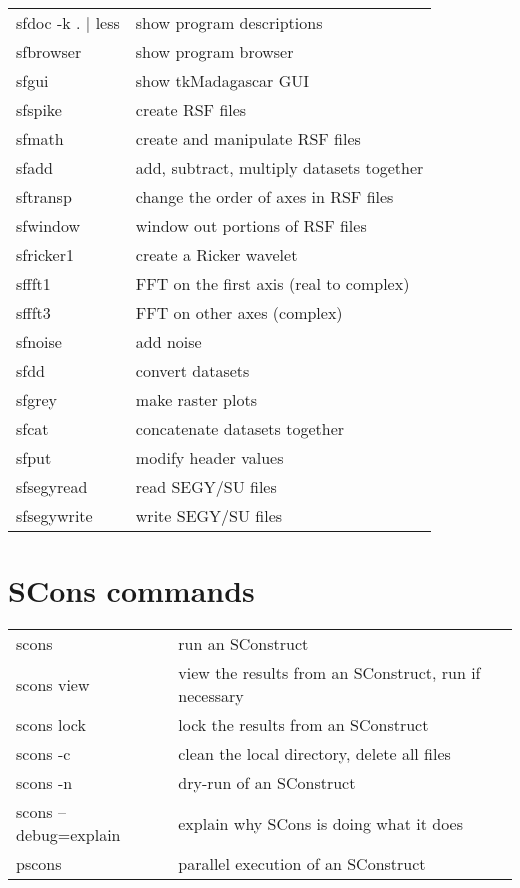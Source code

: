 \begin{tabular}{| l | l |}
   \hline 
   sfdoc -k . $|$ less & show program descriptions \\
   sfbrowser & show program browser \\
   sfgui & show tkMadagascar GUI \\
   sfspike & create RSF files \\
   sfmath & create and manipulate RSF files \\
   sfadd & add, subtract, multiply datasets together \\
   sftransp & change the order of axes in RSF files \\
   sfwindow & window out portions of RSF files \\
   sfricker1 & create a Ricker wavelet \\
   sffft1 & FFT on the first axis (real to complex) \\
   sffft3 & FFT on other axes (complex) \\
   sfnoise & add noise  \\
   sfdd & convert datasets \\
   sfgrey & make raster plots \\
   sfcat & concatenate datasets together \\
   sfput & modify header values \\
   sfsegyread & read SEGY/SU files \\
   sfsegywrite & write SEGY/SU files \\
   \hline
\end{tabular}

\section{SCons commands}

\begin{tabular}{| l | l |}
    \hline
    scons & run an SConstruct \\
    scons view & view the results from an SConstruct, run if necessary \\
    scons lock & lock the results from an SConstruct \\
    scons -c & clean the local directory, delete all files \\
    scons -n & dry-run of an SConstruct \\
    scons --debug=explain & explain why SCons is doing what it does \\
    pscons & parallel execution of an SConstruct  \\
    \hline
\end{tabular}
